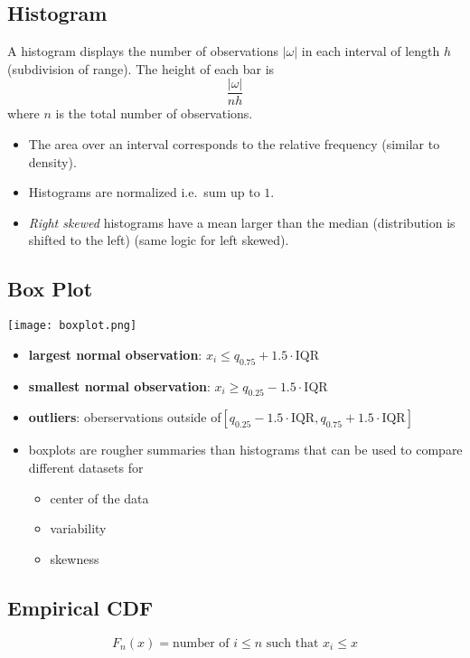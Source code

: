 \subsection{Histogram}
A histogram displays the number of observations $|\omega|$ in each interval of length $h$ (subdivision of range).
The height of each bar is
\noindent\begin{equation*}
    \frac{|\omega|}{nh}
\end{equation*}
where $n$ is the total number of observations.
\begin{itemize}
    \item The area over an interval corresponds to the relative frequency (similar to density).
    \item Histograms are normalized i.e.\ sum up to $1$.
    \item \textit{Right skewed} histograms have a mean larger than the median (distribution is shifted to the left) (same logic for left skewed).
\end{itemize}

\subsection{Box Plot}
\begin{center}
    \texttt{[image: boxplot.png]}
\end{center}
\begin{itemize}
    \item \textbf{largest normal observation}: $x_i\leq q_{0.75}+1.5\cdot$IQR
    \item \textbf{smallest normal observation}: $x_i\geq q_{0.25}-1.5\cdot$IQR
    \item \textbf{outliers}: oberservations outside of\newline $[q_{0.25}-1.5\cdot\text{IQR},q_{0.75}+1.5\cdot\text{IQR}]$
    \item boxplots are rougher summaries than histograms that can be used to compare different datasets for
          \begin{itemize}
              \item center of the data
              \item variability
              \item skewness
          \end{itemize}
\end{itemize}

\subsection{Empirical CDF}
\noindent\begin{equation*}
    F_n(x)= \text{number of } i\le n \text{ such that } x_i\le x
\end{equation*}

